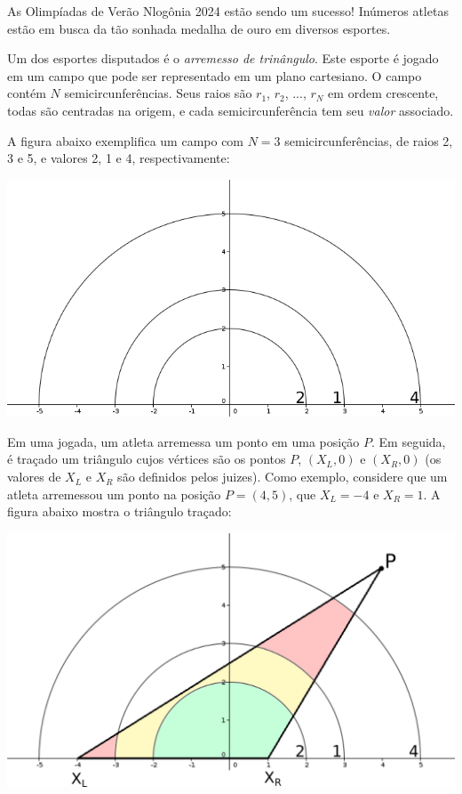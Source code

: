 As Olimpíadas de Verão Nlogônia 2024 estão sendo um sucesso! Inúmeros atletas
estão em busca da tão sonhada medalha de ouro em diversos esportes.

Um dos esportes disputados é o \textit{arremesso de trinângulo}. Este esporte é
jogado em um campo que pode ser representado em um plano cartesiano. O campo
contém $N$ semicircunferências. Seus raios são $r_1$, $r_2$, ..., $r_N$ em ordem
crescente, todas são centradas na origem, e cada semicircunferência tem seu
\textit{valor} associado.

A figura abaixo exemplifica um campo com $N=3$
semicircunferências, de raios 2, 3 e 5, e valores 2, 1 e 4, respectivamente:

\begin{center}
    \includegraphics[scale=0.4]{arremesso/campo.png}
\end{center}

Em uma jogada, um atleta arremessa um ponto em uma posição $P$. Em seguida, é
traçado um triângulo cujos vértices são os pontos $P$, $(X_L, 0)$ e $(X_R, 0)$
(os valores de $X_L$ e $X_R$ são definidos pelos juizes). Como exemplo,
considere que um atleta arremessou um ponto na posição $P=(4,5)$, que $X_L = -4$
e $X_R = 1$. A figura abaixo mostra o triângulo traçado:

\begin{center}
    \includegraphics[scale=0.4]{arremesso/score.png}
\end{center}

